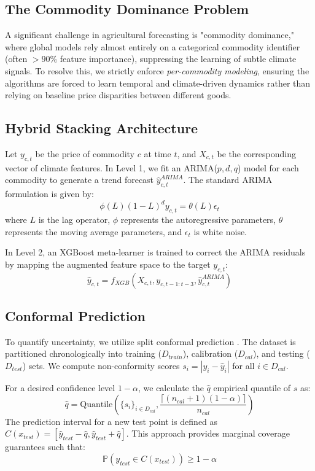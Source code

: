 \documentclass[conference]{IEEEtran}
\begin{document}
\subsection{The Commodity Dominance Problem}
A significant challenge in agricultural forecasting is "commodity dominance," where global models rely almost entirely on a categorical commodity identifier (often $>90\%$ feature importance), suppressing the learning of subtle climate signals. To resolve this, we strictly enforce \textit{per-commodity modeling}, ensuring the algorithms are forced to learn temporal and climate-driven dynamics rather than relying on baseline price disparities between different goods.

\subsection{Hybrid Stacking Architecture}
Let $y_{c,t}$ be the price of commodity $c$ at time $t$, and $X_{c,t}$ be the corresponding vector of climate features. 
In Level 1, we fit an ARIMA($p,d,q$) model for each commodity to generate a trend forecast $\hat{y}_{c,t}^{ARIMA}$. The standard ARIMA formulation is given by:
\begin{equation}
\phi(L)(1-L)^d y_{c,t} = \theta(L) \epsilon_t
\end{equation}
where $L$ is the lag operator, $\phi$ represents the autoregressive parameters, $\theta$ represents the moving average parameters, and $\epsilon_t$ is white noise.

In Level 2, an XGBoost meta-learner is trained to correct the ARIMA residuals by mapping the augmented feature space to the target $y_{c,t}$:
\begin{equation}
\hat{y}_{c,t} = f_{XGB}\left(X_{c,t}, y_{c,t-1:t-3}, \hat{y}_{c,t}^{ARIMA}\right)
\end{equation}

\subsection{Conformal Prediction}
To quantify uncertainty, we utilize split conformal prediction \cite{vovk2005algorithmic}. The dataset is partitioned chronologically into training ($D_{train}$), calibration ($D_{cal}$), and testing ($D_{test}$) sets. We compute non-conformity scores $s_i = |y_i - \hat{y}_i|$ for all $i \in D_{cal}$. 

For a desired confidence level $1-\alpha$, we calculate the $\hat{q}$ empirical quantile of $s$ as:
\begin{equation}
\hat{q} = \text{Quantile}\left(\{s_i\}_{i \in D_{cal}}, \frac{\lceil (n_{cal}+1)(1-\alpha) \rceil}{n_{cal}}\right)
\end{equation}
The prediction interval for a new test point is defined as $C(x_{test}) = [\hat{y}_{test} - \hat{q}, \hat{y}_{test} + \hat{q}]$. This approach provides marginal coverage guarantees such that:
\begin{equation}
\mathbb{P}\left(y_{test} \in C(x_{test})\right) \geq 1 - \alpha
\end{equation}
\end{document}
